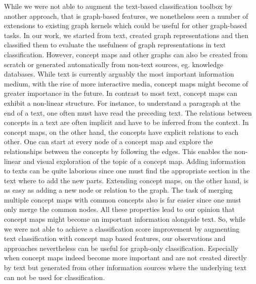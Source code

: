 While we were not able to augment the text-based classification toolbox by another approach, that is graph-based features, we nonetheless seen a number of extensions to existing graph kernels which could be useful for other graph-based tasks.
In our work, we started from text, created graph representations and then classified them to evaluate the usefulness of graph representations in text classification.
However, concept maps and other graphs can also be created from scratch or generated automatically from non-text sources, eg. knowledge databases.
While text is currently arguably the most important information medium, with the rise of more interactive media, concept maps might become of greater importance in the future.
In contrast to most text, concept maps can exhibit a non-linear structure.
For instance, to understand a paragraph at the end of a text, one often must have read the preceding text.
The relations between concepts in a text are often implicit and have to be inferred from the context.
In concept maps, on the other hand, the concepts have explicit relations to each other.
One can start at every node of a concept map and explore the relationships between the concepts by following the edges.
This enables the non-linear and visual exploration of the topic of a concept map.
Adding information to texts can be quite laborious since one must find the appropriate section in the text where to add the new parts.
Extending concept maps, on the other hand, is as easy as adding a new node or relation to the graph.
The task of merging multiple concept maps with common concepts also is far easier since one must only merge the common nodes.
All these properties lead to our opinion that concept maps might become an important information alongside text.
So, while we were not able to achieve a classification score improvement by augmenting text classification with concept map based features, our observations and approaches nevertheless can be useful for graph-only classification.
Especially when concept maps indeed become more important and are not created directly by text but generated from other information sources where the underlying text can not be used for classification.


